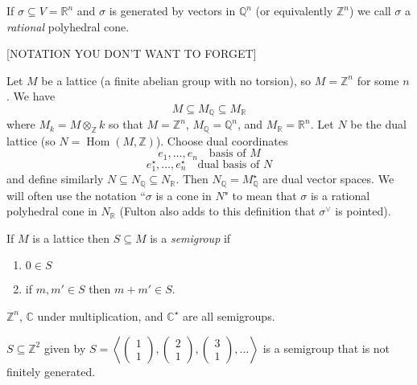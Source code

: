 \documentclass[a4paper,12pt]{amsart}
\DeclareMathOperator{\Hom}{Hom}
\begin{document}
\begin{Def}
If $\sigma \subseteq V = \mathbb{R}^n$ and $\sigma$ is generated by vectors in $\mathbb{Q}^n$ (or equivalently $\mathbb{Z}^n$) we call $\sigma$ a \emph{rational} polyhedral cone.
\end{Def}

[NOTATION YOU DON'T WANT TO FORGET]

Let $M$ be a lattice (a finite abelian group with no torsion), so $M = \mathbb{Z}^n$ for some $n$.
We have
\[
M \subseteq M_{\mathbb{Q}} \subseteq M_{\mathbb{R}}
\]
where $M_k = M \otimes_{\mathbb{Z}} k$ so that $M = \mathbb{Z}^n$, $M_{\mathbb{Q}} = \mathbb{Q}^n$, and $M_{\mathbb{R}} = \mathbb{R}^n$.
Let $N$ be the dual lattice (so $N = \Hom(M, \mathbb{Z})$).
Choose dual coordinates
\[
e_1, \dots, e_n \quad \text{basis of $M$}
\]
\[
e_1^\star, \dots, e_n^\star \quad \text{dual basis of $N$}
\]
and define similarly $N \subseteq N_{\mathbb{Q}} \subseteq N_{\mathbb{R}}$.
Then $N_{\mathbb{Q}} = M_{\mathbb{Q}}^\star$ are dual vector spaces.
We will often use the notation ``$\sigma$ is a cone in $N$" to mean that $\sigma$ is a rational polyhedral cone in $N_{\mathbb{R}}$ (Fulton also adds to this definition that $\sigma^\vee$ is pointed).

\begin{Def}
If $M$ is a lattice then $S \subseteq M$ is a \emph{semigroup} if
\begin{enumerate}
\item $0 \in S$
\item if $m, m' \in S$ then $m + m' \in S$.
\end{enumerate}
\end{Def}

\begin{Eg}
$\mathbb{Z}^n$, $\mathbb{C}$ under multiplication, and $\mathbb{C}^\star$ are all semigroups.
\end{Eg}

\begin{Eg}
$S \subseteq \mathbb{Z}^2$ given by $S = \left\langle \begin{pmatrix}1\\1\end{pmatrix}, \begin{pmatrix}2\\1\end{pmatrix}, \begin{pmatrix}3\\1\end{pmatrix}, \dots \right\rangle$ is a semigroup that is not finitely generated.
\end{Eg}
\end{document}
